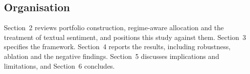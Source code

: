 \subsection{Organisation}

Section~2 reviews portfolio construction, regime-aware allocation and the treatment of
textual sentiment, and positions this study against them. Section~3 specifies the
framework. Section~4 reports the results, including robustness, ablation and the
negative findings. Section~5 discusses implications and limitations, and Section~6
concludes.
